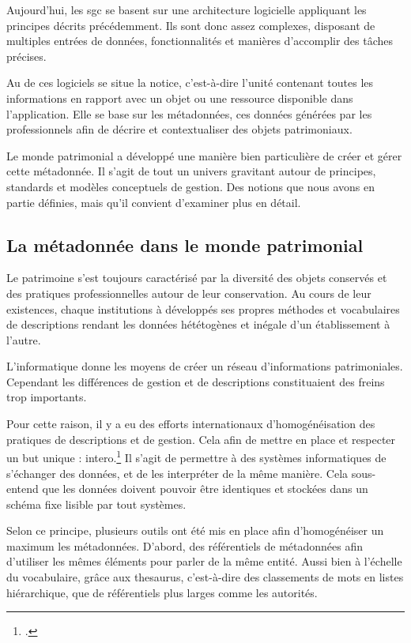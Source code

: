\label{chap:défis-patrimoniaux}

Aujourd'hui, les \gls{sgc} se basent sur une architecture logicielle appliquant les principes décrits précédemment. Ils sont donc assez complexes, disposant de multiples entrées de données, fonctionnalités et manières d'accomplir des tâches précises. 

Au \coeur de ces logiciels se situe la notice, c'est-à-dire l'unité contenant toutes les informations en rapport avec un objet ou une ressource disponible dans l'application. Elle se base sur les métadonnées, ces données générées par les professionnels afin de décrire et contextualiser des objets patrimoniaux. 

Le monde patrimonial a développé une manière bien particulière de créer et gérer cette métadonnée. Il s'agit de tout un univers gravitant autour de principes, standards et modèles conceptuels de gestion. Des notions que nous avons en partie définies, mais qu'il convient d'examiner plus en détail.

\subsection{La métadonnée dans le monde patrimonial}

Le patrimoine s'est toujours caractérisé par la diversité des objets conservés et des pratiques professionnelles autour de leur conservation. Au cours de leur existences, chaque institutions à développés ses propres méthodes et vocabulaires de descriptions rendant les données hététogènes et inégale d'un établissement à l'autre.

L'informatique donne les moyens de créer un réseau d'informations patrimoniales. Cependant les différences de gestion et de descriptions constituaient des freins trop importants. 

Pour cette raison, il y a eu des efforts internationaux d'homogénéisation des pratiques de descriptions et de gestion. Cela afin de mettre en place et respecter un but unique : \gls{intero}.\footcite{jonkerQuestceQueLinteroperabilite2026} Il s'agit de permettre à des systèmes informatiques de s'échanger des données, et de les interpréter de la même manière. Cela sous-entend que les données doivent pouvoir être identiques et stockées dans un schéma fixe lisible par tout systèmes.\newline

Selon ce principe, plusieurs outils ont été mis en place afin d'homogénéiser un maximum les métadonnées. D'abord, des référentiels de métadonnées afin d'utiliser les mêmes éléments pour parler de la même entité. Aussi bien à l'échelle du vocabulaire, grâce aux \gls{thesaurus}, c'est-à-dire des classements de mots en listes hiérarchique, que de référentiels plus larges comme les autorités. 

